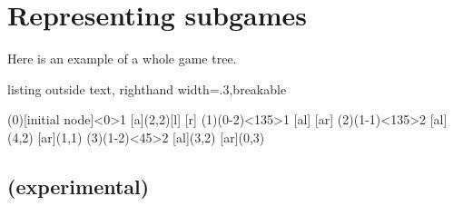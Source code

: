 %
%
%
%
%
%
%

\section{Representing subgames}

Here is an example of a whole game tree.

\begin{tcblisting}{listing outside text, righthand width=.3\linewidth,breakable}
\begin{istgame}
\xtdistance{15mm}{30mm}
\istroot[-135](0)[initial node]<0>{1}
  [a]{(2,2)}[l]           [r]  \endist 
\istroot(1)(0-2)<135>{1}
                   [al]  [ar]  \endist 
\xtdistance{10mm}{20mm}
\istroot(2)(1-1)<135>{2}
  \istb{\ell}[al]{(4,2)}  [ar]{(1,1)}  \endist 
\istroot(3)(1-2)<45>{2}
  \istb{\ell}[al]{(3,2)}  [ar]{(0,3)}  \endist 
\end{istgame}
\end{tcblisting}

\subsection{\protect\cmd{\xtSubgameBox} (experimental)}

\subsubsection{\protect\cmd{\xtSubgameBox}}

